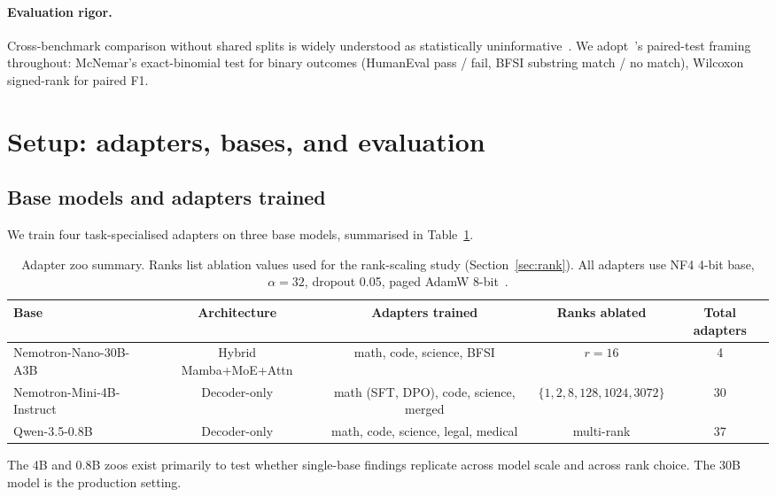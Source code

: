 \documentclass{article}
\begin{document}
\paragraph{Evaluation rigor.} Cross-benchmark comparison without shared splits is widely understood as statistically uninformative~\citep{liang2023helm, srivastava2023bigbench}. We adopt~\citet{dietterich1998approximate}'s paired-test framing throughout: McNemar's exact-binomial test for binary outcomes (HumanEval pass / fail, BFSI substring match / no match), Wilcoxon signed-rank for paired F1.


\section{Setup: adapters, bases, and evaluation}
\label{sec:setup}

\subsection{Base models and adapters trained}

We train four task-specialised adapters on three base models, summarised in Table~\ref{tab:setup}.

\begin{table}[h]
  \caption{Adapter zoo summary. Ranks list ablation values used for the rank-scaling study (Section~\ref{sec:rank}). All adapters use NF4 4-bit base, $\alpha = 32$, dropout 0.05, paged AdamW 8-bit~\citep{dettmers2022paged}.}
  \label{tab:setup}
  \centering
  \footnotesize
  \begin{tabular}{lcccc}
    \toprule
    Base & Architecture & Adapters trained & Ranks ablated & Total adapters \\
    \midrule
    Nemotron-Nano-30B-A3B & Hybrid Mamba+MoE+Attn & math, code, science, BFSI & $r{=}16$ & 4 \\
    Nemotron-Mini-4B-Instruct & Decoder-only & math (SFT, DPO), code, science, merged & $\{1,2,8,128,1024,3072\}$ & 30 \\
    Qwen-3.5-0.8B & Decoder-only & math, code, science, legal, medical & multi-rank & 37 \\
    \bottomrule
  \end{tabular}
\end{table}

The 4B and 0.8B zoos exist primarily to test whether single-base findings replicate across model scale and across rank choice. The 30B model is the production setting.
\end{document}
